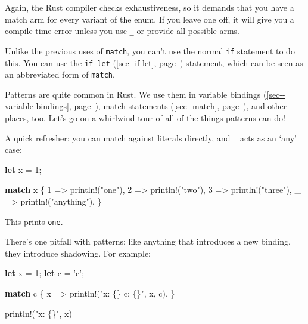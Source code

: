 \documentclass[a4paper,]{book}
\renewcommand*{\hyperref}[2][\ar]{%
  \def\ar{#2}%
  #2 (\autoref{#1}, page~\pageref{#1})}
\newenvironment{Shaded}{\begin{snugshade}}{\end{snugshade}}
\newcommand{\KeywordTok}[1]{\textcolor[rgb]{0.13,0.29,0.53}{\textbf{{#1}}}}
\newcommand{\DecValTok}[1]{\textcolor[rgb]{0.00,0.00,0.81}{{#1}}}
\newcommand{\CharTok}[1]{\textcolor[rgb]{0.31,0.60,0.02}{{#1}}}
\newcommand{\StringTok}[1]{\textcolor[rgb]{0.31,0.60,0.02}{{#1}}}
\newcommand{\OtherTok}[1]{\textcolor[rgb]{0.56,0.35,0.01}{{#1}}}
\newcommand{\NormalTok}[1]{{#1}}
\begin{document}
Again, the Rust compiler checks exhaustiveness, so it demands that you
have a match arm for every variant of the enum. If you leave one off, it
will give you a compile-time error unless you use \texttt{\_} or provide
all possible arms.

Unlike the previous uses of \texttt{match}, you can't use the normal
\texttt{if} statement to do this. You can use the
\hyperref[sec--if-let]{\texttt{if\ let}} statement, which can be seen as
an abbreviated form of \texttt{match}.


Patterns are quite common in Rust. We use them in
\hyperref[sec--variable-bindings]{variable bindings},
\hyperref[sec--match]{match statements}, and other places, too. Let's go
on a whirlwind tour of all of the things patterns can do!

A quick refresher: you can match against literals directly, and
\texttt{\_} acts as an `any' case:

\begin{Shaded}
\begin{Highlighting}[]
\KeywordTok{let} \NormalTok{x = }\DecValTok{1}\NormalTok{;}

\KeywordTok{match} \NormalTok{x \{}
    \DecValTok{1} \NormalTok{=> }\OtherTok{println!}\NormalTok{(}\StringTok{"one"}\NormalTok{),}
    \DecValTok{2} \NormalTok{=> }\OtherTok{println!}\NormalTok{(}\StringTok{"two"}\NormalTok{),}
    \DecValTok{3} \NormalTok{=> }\OtherTok{println!}\NormalTok{(}\StringTok{"three"}\NormalTok{),}
    \NormalTok{_ => }\OtherTok{println!}\NormalTok{(}\StringTok{"anything"}\NormalTok{),}
\NormalTok{\}}
\end{Highlighting}
\end{Shaded}

This prints \texttt{one}.

There's one pitfall with patterns: like anything that introduces a new
binding, they introduce shadowing. For example:

\begin{Shaded}
\begin{Highlighting}[]
\KeywordTok{let} \NormalTok{x = }\DecValTok{1}\NormalTok{;}
\KeywordTok{let} \NormalTok{c = }\CharTok{'c'}\NormalTok{;}

\KeywordTok{match} \NormalTok{c \{}
    \NormalTok{x => }\OtherTok{println!}\NormalTok{(}\StringTok{"x: \{\} c: \{\}"}\NormalTok{, x, c),}
\NormalTok{\}}

\OtherTok{println!}\NormalTok{(}\StringTok{"x: \{\}"}\NormalTok{, x)}
\end{Highlighting}
\end{Shaded}
\end{document}
